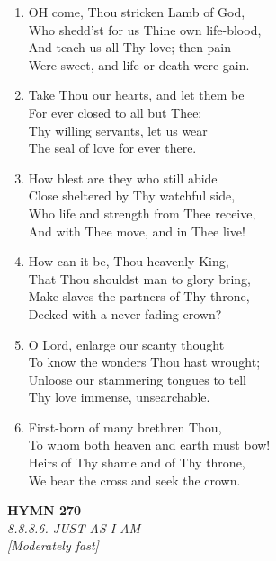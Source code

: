 \documentclass[11pt,a4paper]{article}
\begin{document}
\begin{enumerate}
    \item OH come, Thou stricken Lamb of God, \\
        Who shedd'st for us Thine own life-blood, \\
        And teach us all Thy love; then pain \\
        Were sweet, and life or death were gain.

    \item Take Thou our hearts, and let them be \\
        For ever closed to all but Thee; \\
        Thy willing servants, let us wear \\
        The seal of love for ever there.

    \item How blest are they who still abide \\
        Close sheltered by Thy watchful side, \\
        Who life and strength from Thee receive, \\
        And with Thee move, and in Thee live!

    \item How can it be, Thou heavenly King, \\
        That Thou shouldst man to glory bring, \\
        Make slaves the partners of Thy throne, \\
        Decked with a never-fading crown?

    \item O Lord, enlarge our scanty thought \\
        To know the wonders Thou hast wrought; \\
        Unloose our stammering tongues to tell \\
        Thy love immense, unsearchable.

    \item First-born of many brethren Thou, \\
        To whom both heaven and earth must bow! \\
        Heirs of Thy shame and of Thy throne, \\
        We bear the cross and seek the crown.

\end{enumerate}

\newpage
\begin{center}
    {\Large \textbf{HYMN 270}}
    \\
    \textit{8.8.8.6. JUST AS I AM}
    \\
    \textit{\small [Moderately fast]}
\end{center}
\vspace{1em}
\end{document}
